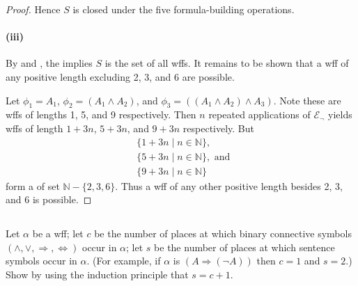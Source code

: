\documentclass{report}
\begin{document}
\begin{proof}
      Hence $S$ is closed under the five formula-building operations.

    \paragraph{(iii)}%

      By  and , the
         implies $S$ is the set of all wffs.
      It remains to be shown that a wff of any positive length excluding 2, 3,
        and 6 are possible.

      Let $\phi_1 = A_1$, $\phi_2 = (A_1 \land A_2)$, and
        $\phi_3 = ((A_1 \land A_2) \land A_3)$.
      Note these are wffs of lengths 1, 5, and 9 respectively.
      Then $n$ repeated applications of $\mathcal{E}_{\neg}$ yields wffs of
        length $1 + 3n$, $5 + 3n$, and $9 + 3n$ respectively.
      But
        \begin{align*}
          & \{ 1 + 3n \mid n \in \mathbb{N} \}, \\
          & \{ 5 + 3n \mid n \in \mathbb{N} \}, \text{ and } \\
          & \{ 9 + 3n \mid n \in \mathbb{N} \}
        \end{align*}
        form a  of set $\mathbb{N} - \{ 2, 3, 6 \}$.
      Thus a wff of any other positive length besides 2, 3, and 6 is possible.

  \end{proof}

\subsection{}%

  Let $\alpha$ be a wff; let $c$ be the number of places at which binary
    connective symbols $(\land, \lor, \Rightarrow, \Leftrightarrow)$ occur in
    $\alpha$; let $s$ be the number of places at which sentence symbols occur in
    $\alpha$.
  (For example, if $\alpha$ is $(A \Rightarrow (\neg A))$ then $c = 1$ and
    $s = 2$.)
  Show by using the induction principle that $s = c + 1$.
\end{document}
